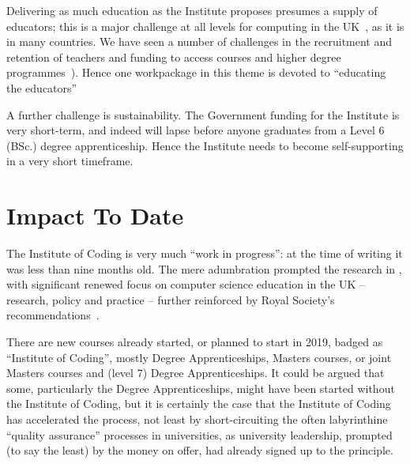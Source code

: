\documentclass[sigconf,anonymous]{acmart}
\begin{document}
Delivering as much education as the Institute proposes presumes a
supply of educators; this is a major challenge at all levels for
computing in the UK~\cite{brown-et-al:toce2014}, as it is in many
countries. We have seen a number of challenges in the recruitment and
retention of teachers 
and funding to
access courses and higher degree
programmes~\cite{sentance-et-al-wipsce2012}).  Hence one workpackage
in this theme is devoted to ``educating the educators''

A further challenge is sustainability. The Government funding for the
Institute is very short-term, and indeed will lapse before anyone
graduates from a Level 6 (BSc.)  degree apprenticeship. Hence the
Institute needs to become self-supporting in a very short timeframe.




\section{Impact To Date}

The Institute of Coding is very much ``work in progress'': at the time
of writing it was less than nine months old.  The mere adumbration
\cite{HMG2015a} prompted the research in
\cite{murphy-et-al:programming2017}, with significant renewed focus on
computer science education in the UK -- research, policy and practice
-- further reinforced by Royal Society's
recommendations~\cite{rs:2017}.

There are new courses already started, or planned to start in 2019,
badged as ``Institute of Coding'', mostly Degree Apprenticeships,
Masters courses, or joint Masters courses and (level 7) Degree
Apprenticeships.  It could be argued that some, particularly the
Degree Apprenticeships, might have been started without the Institute
of Coding, but it is certainly the case that the Institute of Coding
has accelerated the process, not least by short-circuiting the often
labyrinthine ``quality assurance'' processes in universities, as
university leadership, prompted (to say the least) by the money on
offer, had already signed up to the principle.
\end{document}
